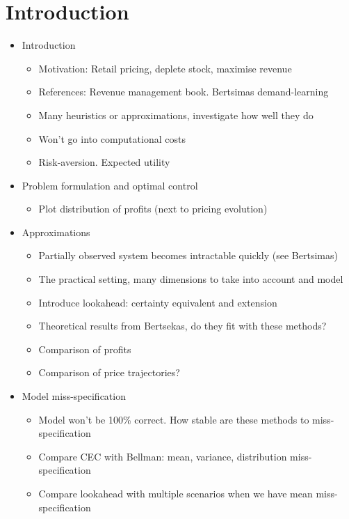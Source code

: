 \documentclass[main.tex]{subfiles}
\begin{document}
\listoftodos[Notes]

\section{Introduction}

\begin{itemize}
\item Introduction
  \begin{itemize}
  \item Motivation: Retail pricing, deplete stock, maximise revenue
  \item References: Revenue management book. Bertsimas demand-learning
  \item Many heuristics or approximations, investigate how well they
    do
  \item Won't go into computational costs
  \item Risk-aversion. Expected utility
  \end{itemize}
\item Problem formulation and optimal control
  \begin{itemize}
  \item Plot distribution of profits (next to pricing evolution)
  \end{itemize}
\item Approximations
  \begin{itemize}
  \item Partially observed system becomes intractable
    quickly (see Bertsimas)
  \item The practical setting, many dimensions to take into account
    and model
  \item Introduce lookahead: certainty equivalent and extension
  \item Theoretical results from Bertsekas, do they fit with these methods?
  \item Comparison of profits
  \item Comparison of price trajectories?
  \end{itemize}
\item Model miss-specification
  \begin{itemize}
  \item Model won't be 100\% correct. How stable are these methods to miss-specification
  \item Compare CEC with Bellman: mean, variance, distribution
    miss-specification
  \item Compare lookahead with multiple scenarios when we have mean miss-specification

\end{itemize}
\end{itemize}
\end{document}
